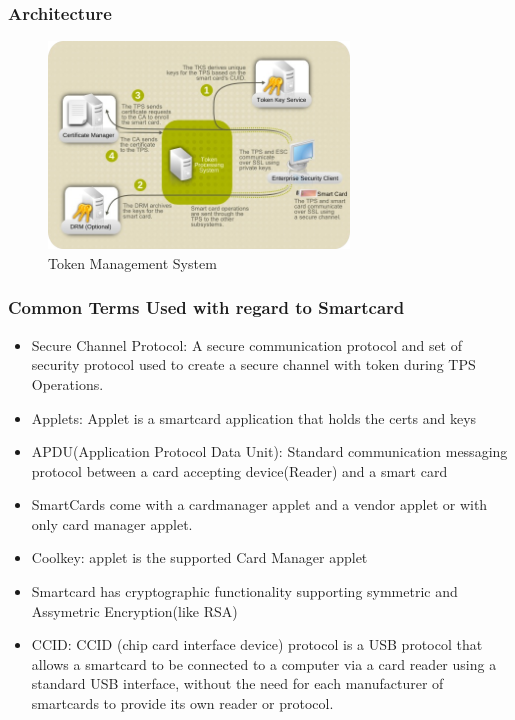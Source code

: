 \documentclass[12pt]{report}
\begin{document}
\subsubsection{Architecture}
\begin{figure}[H]
    \centering
    \includegraphics[width=80mm]{Images/TMS-workflow.png}
    \caption{Token Management System}
\end{figure}
\subsubsection{Common Terms Used with regard to Smartcard}
    \begin{itemize}
        \item Secure Channel Protocol: A secure communication protocol and set of security protocol used to 
            create a secure channel with token during TPS Operations.
        \item Applets: Applet is a smartcard application that holds the certs and keys
        \item APDU(Application Protocol Data Unit): Standard communication messaging protocol between a card accepting device(Reader)
            and a smart card 
        \item SmartCards come with a cardmanager applet and a vendor applet or with only card manager applet. 
        \item Coolkey: applet is the supported Card Manager applet
        \item Smartcard has cryptographic functionality supporting symmetric and Assymetric Encryption(like RSA)
        \item CCID: CCID (chip card interface device) protocol is a USB protocol that allows a smartcard to be 
            connected to a computer via a card reader using a standard USB interface, without the need for 
            each manufacturer of smartcards to provide its own reader or protocol.~\cite{wiki:ccid}
    \end{itemize}
\end{document}
